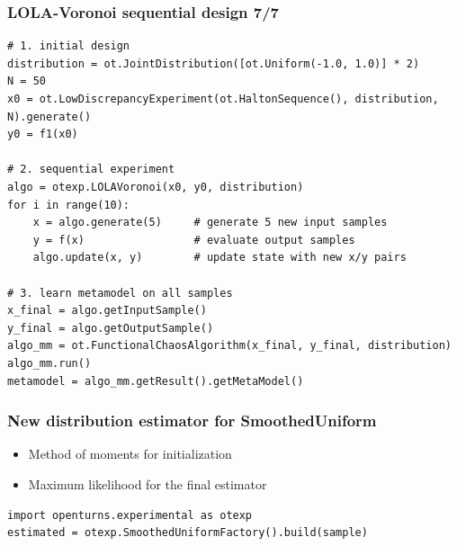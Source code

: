 \documentclass[aspectratio=169]{beamer}
\begin{document}
\begin{frame}[containsverbatim]
\frametitle{LOLA-Voronoi sequential design 7/7}

\begin{small}
\lstset{language=python}
\begin{lstlisting}
# 1. initial design
distribution = ot.JointDistribution([ot.Uniform(-1.0, 1.0)] * 2)
N = 50
x0 = ot.LowDiscrepancyExperiment(ot.HaltonSequence(), distribution, N).generate()
y0 = f1(x0)

# 2. sequential experiment
algo = otexp.LOLAVoronoi(x0, y0, distribution)
for i in range(10):
    x = algo.generate(5)     # generate 5 new input samples
    y = f(x)                 # evaluate output samples
    algo.update(x, y)        # update state with new x/y pairs

# 3. learn metamodel on all samples
x_final = algo.getInputSample()
y_final = algo.getOutputSample()
algo_mm = ot.FunctionalChaosAlgorithm(x_final, y_final, distribution)
algo_mm.run()
metamodel = algo_mm.getResult().getMetaModel()
\end{lstlisting}
\end{small}


\end{frame}


\begin{frame}[containsverbatim]
\frametitle{New distribution estimator for SmoothedUniform}

\begin{itemize}
\item Method of moments for initialization
\item Maximum likelihood for the final estimator
\end{itemize}


\begin{small}
\lstset{language=python}
\begin{lstlisting}
import openturns.experimental as otexp
estimated = otexp.SmoothedUniformFactory().build(sample)
\end{lstlisting}
\end{small}


\end{frame}
\end{document}
